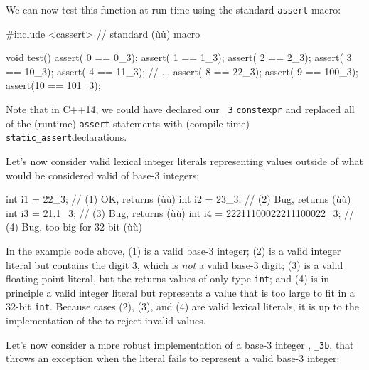 \noindent We can now test this function at run time using the standard
\lstinline!assert! macro:

\begin{emcppslisting}
#include <cassert>  // standard (ù{}ù) macro

void test()
{
    assert( 0 ==   0_3);
    assert( 1 ==   1_3);
    assert( 2 ==   2_3);
    assert( 3 ==  10_3);
    assert( 4 ==  11_3);
    // ...
    assert( 8 ==  22_3);
    assert( 9 == 100_3);
    assert(10 == 101_3);
}
\end{emcppslisting}
    
\noindent Note that in C++14, we could have declared our \lstinline!_3!  \lstinline!constexpr! and replaced all of the (runtime)
\lstinline!assert! statements with (compile-time) \lstinline!static_assert!\linebreak[4]%
\mbox{declarations}.

Let's now consider valid lexical integer literals representing values
outside of what would be considered valid of base-3 integers:

\begin{emcppslisting}
int i1 = 22_3;                    // (1) OK, returns (ù{}ù)
int i2 = 23_3;                    // (2) Bug, returns (ù{}ù)
int i3 = 21.1_3;                  // (3) Bug, returns (ù{}ù)
int i4 = 22211100022211100022_3;  // (4) Bug, too big for 32-bit (ù{}ù)
\end{emcppslisting}
    
\noindent In the example code above, (1) is a valid base-3 integer; (2) is a valid
integer literal but contains the digit 3, which is \emph{not} a valid
base-3 digit; (3) is a valid floating-point literal, but the  returns values of only type \lstinline!int!; and (4) is in
principle a valid integer literal but represents a value that is too
large to fit in a 32-bit \lstinline!int!. Because cases (2), (3), and (4)
are valid lexical literals, it is up to the implementation of the
 to reject invalid values.

Let's now consider a more robust implementation of a base-3 integer
, \lstinline!_3b!, that throws an exception when the literal
fails to represent a valid base-3 integer:

